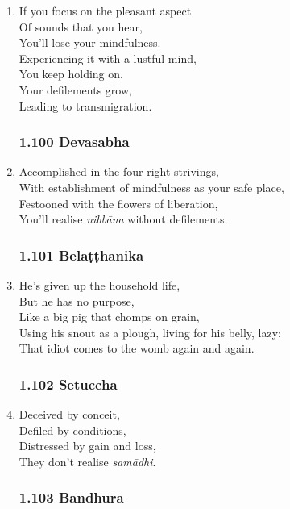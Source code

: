 \documentclass[10pt, openany]{book}
\begin{document}
\begin{enumerate}
\item If you focus on the pleasant aspect\\
Of sounds that you hear, \\
You’ll lose your mindfulness.\\
Experiencing it with a lustful mind,\\
You keep holding on.\\
Your defilements grow,\\
Leading to transmigration.

\subsubsection*{1.100 Devasabha}

\item Accomplished in the four right strivings,\\
With establishment of mindfulness as your safe place,\\
Festooned with the flowers of liberation,\\
You’ll realise \emph{nibbāna} without defilements.

\subsubsection*{1.101 Belaṭṭhānika}

\item He’s given up the household life, \\
But he has no purpose,\\
Like a big pig that chomps on grain,\\
Using his snout as a plough, living for his belly, lazy:\\
That idiot comes to the womb again and again.

\subsubsection*{1.102 Setuccha}

\item Deceived by conceit,\\
Defiled by conditions,\\
Distressed by gain and loss,\\
They don’t realise \emph{samādhi}.

\subsubsection*{1.103 Bandhura}


\end{enumerate}
\end{document}
